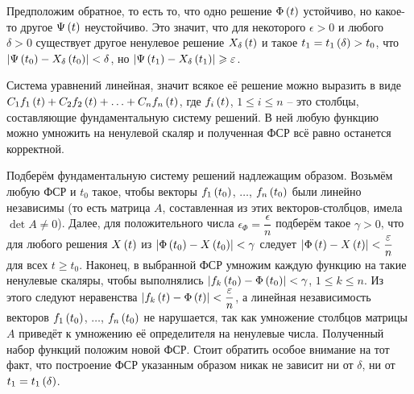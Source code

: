 \documentclass[a5paper,10pt]{article}
\begin{document}
Предположим обратное, то есть то, что одно решение $\Phi\left(t\right)$ устойчиво, но какое-то другое $\Psi\left(t\right)$ неустойчиво. Это значит, что для некоторого $\epsilon > 0$ и любого $\delta > 0$ существует другое ненулевое решение $X_{\delta}\left(t\right)$ и такое $t_{1} = t_{1}\left(\delta\right)> t_{0}$, что $\left|\Psi\left(t_{0}\right) - X_{\delta}\left(t_{0}\right)\right| < \delta$, но $\left|\Psi\left(t_{1}\right) - X_{\delta}\left(t_{1}\right)\right| \geqslant \varepsilon$.

Система уравнений линейная, значит всякое её решение можно выразить в виде 
$C_{1} f_{1}\left(t\right) + C_{2} f_{2}\left(t\right) + \ldots + C_{n} f_{n}\left(t\right)$,
где $f_{i}\left(t\right)$, $1 \le i \le n$ -- это столбцы, составляющие фундаментальную систему решений. В ней любую функцию можно умножить на ненулевой скаляр и полученная ФСР всё равно останется корректной.

Подберём фундаментальную систему решений надлежащим образом. Возьмём любую ФСР и $t_{0}$ такое, чтобы векторы $f_{1}\left(t_{0}\right)$, $\ldots$, $f_{n}\left(t_{0}\right)$ были линейно независимы (то есть матрица $A$, составленная из этих векторов-столбцов, имела $\det A \ne 0$). Далее, для положительного числа $\epsilon_{\Phi} = \dfrac {\epsilon} {n}$ подберём такое $\gamma > 0$, что для любого решения $X\left(t\right)$ из $\left|\Phi\left(t_{0}\right) - X\left(t_{0}\right)\right| < \gamma$ следует $\left|\Phi\left(t\right) - X\left(t\right)\right| < \dfrac {\varepsilon} {n}$ для всех $t \ge t_{0}$. Наконец, в выбранной ФСР умножим каждую функцию на такие ненулевые скаляры, чтобы выполнялись $\left|f_{k}\left(t_{0}\right) - \Phi\left(t_{0}\right)\right| < \gamma$, $1 \le k \le n$. Из этого следуют неравенства $\left|f_{k}\left(t\right) - \Phi\left(t\right)\right| < \dfrac {\varepsilon} {n}$, а линейная независимость векторов $f_{1}\left(t_{0}\right)$, $\ldots$, $f_{n}\left(t_{0}\right)$ не нарушается, так как умножение столбцов матрицы $A$ приведёт к умножению её определителя на ненулевые числа. Полученный набор функций положим новой ФСР. Стоит обратить особое внимание на тот факт, что построение ФСР указанным образом никак не зависит ни от $\delta$, ни от $t_{1} = t_{1}\left(\delta\right)$.
\end{document}
